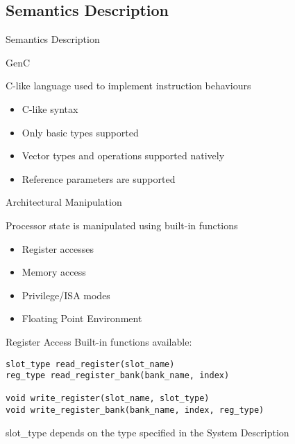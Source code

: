 \subsection{Semantics Description}

\begin{frame}{Semantics Description}
\usebox{\modelcomponentsbox}
\end{frame}


\begin{frame}{GenC}

C-like language used to implement instruction behaviours
\begin{itemize}
\item C-like syntax
\item Only basic types supported
\item Vector types and operations supported natively
\item Reference parameters are supported
\end{itemize}

\end{frame}

\begin{frame}{Architectural Manipulation}

Processor state is manipulated using built-in functions
\begin{itemize}
\item Register accesses
\item Memory access
\item Privilege/ISA modes
\item Floating Point Environment
\end{itemize}

\end{frame}

\begin{frame}[fragile]{Register Access}
Built-in functions available:
\begin{lstlisting}
slot_type read_register(slot_name)
reg_type read_register_bank(bank_name, index)

void write_register(slot_name, slot_type)
void write_register_bank(bank_name, index, reg_type)
\end{lstlisting}

slot\_type depends on the type specified in the System Description

\end{frame}

